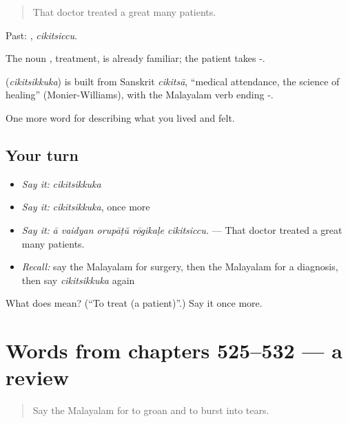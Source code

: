 \begin{quote}
That doctor treated a great many patients.
\end{quote}

Past: , \emph{cikitsiccu}.

The noun , treatment, is already familiar; the patient takes -.

\begin{cousinweb}
\textbf{} (\emph{cikitsikkuka}) is built from Sanskrit \emph{cikitsā}, \textquotedblleft{}medical attendance, the science of healing\textquotedblright{} (Monier-Williams), with the Malayalam verb ending -.
\end{cousinweb}

\begin{grammarlens}[title={What you've built}]
One more word for describing what you lived and felt.
\end{grammarlens}

\subsection*{Your turn}
\begin{itemize}
\raggedright
  \item \emph{Say it:} \emph{cikitsikkuka}
  \item \emph{Say it:} \emph{cikitsikkuka}, once more
  \item \emph{Say it:} \emph{ā vaidyan orupāṭŭ rōgikaḷe cikitsiccu.} — That doctor treated a great many patients.
  \item \emph{Recall:} say the Malayalam for surgery, then the Malayalam for a diagnosis, then say \emph{cikitsikkuka} again
\end{itemize}

\begin{tcolorbox}[breakable,colback=teal!4,colframe=teal!35!black,title={Before you move on}]
What does  mean? (\textquotedblleft{}To treat (a patient)\textquotedblright{}.) Say it once more.
\end{tcolorbox}
\section[(dialogue)]{Words from chapters 525–532 — a review}

\label{lesson:ML-R532-review-525-532}



\begin{quote}
Say the Malayalam for to groan and to burst into tears.
\end{quote}

